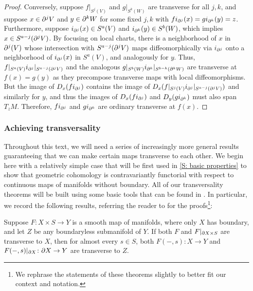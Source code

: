 \begin{remark}
\begin{proof}
	Conversely, suppose $f|_{S^j(V)}$ and $g|_{S^k(W)}$ are transverse for all $j,k$, and suppose $x\in \partial^jV$ and $y\in \partial^kW$ for some fixed $j,k$ with $fi_{\partial^j}(x)=gi_{\partial^k}(y)=z$.
	Furthermore, suppose $i_{\partial^j}(x)\in S^a(V)$ and $i_{\partial^k}(y)\in S^b(W)$, which implies $x\in S^{a-j}(\partial^j V)$.
	By focusing on local charts, there is a neighborhood of $x$ in $\partial^j(V)$ whose intersection with $S^{a-j}(\partial^j V)$ maps diffeomorphically via $i_{\partial^j}$ onto a neighborhood of $i_{\partial^j}(x)$ in $S^a(V)$, and analogously for $y$.
	Thus, $f|_{S^a(V)}i_{\partial^j}|_{S^{a-j}(\partial^j V)}$ and the analogous $g|_{S^b(W)}i_{\partial^k}|_{S^{b-k}(\partial^k W)}$ are transverse at $f(x)=g(y)$ as they precompose transverse maps with local diffeomorphisms.
	But the image of $D_x(fi_{\partial^j})$ contains the image of $D_x(f|_{S^j(V)}i_{\partial^j}|_{S^{a-j}(\partial^j V)})$ and similarly for $y$, and thus the images of $D_x(fi_{\partial^j})$ and $D_y(gi_{\partial^k})$ must also span $T_{z}M$.
	Therefore, $fi_{\partial^j}$ and $gi_{\partial^k}$ are ordinary transverse at $f(x)$.
\end{proof}

\subsubsection{Achieving transversality}

Throughout this text, we will need a series of increasingly more general results guaranteeing that we can make certain maps transverse to each other.
We begin here with a relatively simple case that will be first used in \cref{S: basic properties} to show that geometric cohomology is contravariantly functorial with respect to continuous maps of manifolds without boundary.
All of our transversality theorems will be built using some basic tools that can be found in \cite[Section 2.3]{GuPo74}.
In particular, we record the following results, referring the reader to \cite[Section 2.3]{GuPo74} for the proofs\footnote{We rephrase the statements of these theorems slightly to better fit our context and notation.}:

\begin{theorem}
	Suppose $F \colon X\times S\to Y$ is a smooth map of manifolds, where only $X$ has boundary, and let $Z$ be any boundaryless submanifold of $Y$.
	If both $F$ and $F|_{\partial X\times S}$ are transverse to $X$, then for almost every $s\in S$, both $F(-,s) \colon X\to Y$ and $F(-,s)|_{\partial X} \colon \partial X\to Y$ are transverse to $Z$.
\end{theorem}


\end{remark}
